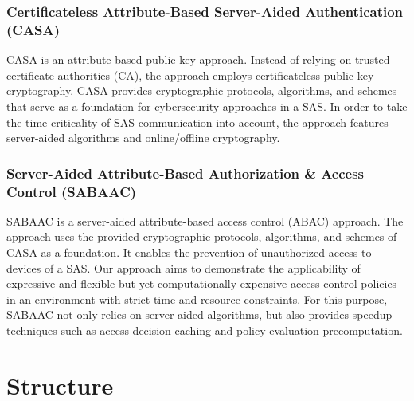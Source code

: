 \subsubsection*{Certificateless Attribute-Based Server-Aided Authentication (CASA)}
CASA is an attribute-based public key approach.
Instead of relying on trusted certificate authorities (CA), the approach employs certificateless public key cryptography.
CASA provides cryptographic protocols, algorithms, and schemes that serve as a foundation for cybersecurity approaches in a SAS.
In order to take the time criticality of SAS communication into account, the approach features server-aided algorithms and online/offline cryptography.

\subsubsection*{Server-Aided Attribute-Based Authorization \& Access Control (SABAAC)}
SABAAC is a server-aided attribute-based access control (ABAC) approach.
The approach uses the provided cryptographic protocols, algorithms, and schemes of CASA as a foundation.
It enables the prevention of unauthorized access to devices of a SAS.
Our approach aims to demonstrate the applicability of expressive and flexible but yet computationally expensive access control policies in an environment with strict time and resource constraints.
For this purpose, SABAAC not only relies on server-aided algorithms, but also provides speedup techniques such as access decision caching and policy evaluation precomputation.

\section{Structure}
\label{sec:introduction:structure}
